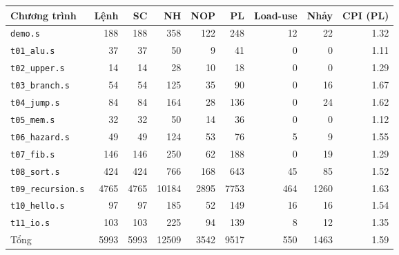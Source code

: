 \begin{tabular}{@{}lrrrrrrrr@{}}
\toprule
Chương trình & Lệnh & SC & NH & NOP & PL & Load-use & Nhảy & CPI (PL) \\
\midrule
\texttt{demo.s} & 188 & 188 & 358 & 122 & 248 & 12 & 22 & 1.32 \\
\texttt{t01\_alu.s} & 37 & 37 & 50 & 9 & 41 & 0 & 0 & 1.11 \\
\texttt{t02\_upper.s} & 14 & 14 & 28 & 10 & 18 & 0 & 0 & 1.29 \\
\texttt{t03\_branch.s} & 54 & 54 & 125 & 35 & 90 & 0 & 16 & 1.67 \\
\texttt{t04\_jump.s} & 84 & 84 & 164 & 28 & 136 & 0 & 24 & 1.62 \\
\texttt{t05\_mem.s} & 32 & 32 & 50 & 14 & 36 & 0 & 0 & 1.12 \\
\texttt{t06\_hazard.s} & 49 & 49 & 124 & 53 & 76 & 5 & 9 & 1.55 \\
\texttt{t07\_fib.s} & 146 & 146 & 250 & 62 & 188 & 0 & 19 & 1.29 \\
\texttt{t08\_sort.s} & 424 & 424 & 766 & 168 & 643 & 45 & 85 & 1.52 \\
\texttt{t09\_recursion.s} & 4765 & 4765 & 10184 & 2895 & 7753 & 464 & 1260 & 1.63 \\
\texttt{t10\_hello.s} & 97 & 97 & 185 & 52 & 149 & 16 & 16 & 1.54 \\
\texttt{t11\_io.s} & 103 & 103 & 225 & 94 & 139 & 8 & 12 & 1.35 \\
\midrule
Tổng & 5993 & 5993 & 12509 & 3542 & 9517 & 550 & 1463 & 1.59 \\
\bottomrule
\end{tabular}
